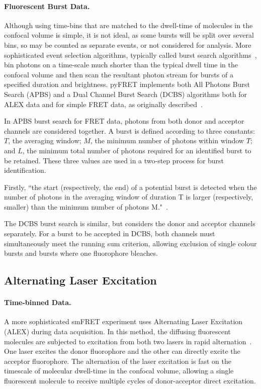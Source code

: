 \paragraph{Fluorescent Burst Data.}
Although using time-bins that are matched to the dwell-time of molecules in the confocal volume is simple, it is not ideal, as some bursts will be split over several bins, so may be counted as separate events, or not considered for analysis. More sophisticated event selection algorithms, typically called burst search algorithms~\cite{nir06}, bin photons on a time-scale much shorter than the typical dwell time in the confocal volume and then scan the resultant photon stream for bursts of a specified duration and brightness. pyFRET implements both All Photons Burst Search (APBS) and a Dual Channel Burst Search (DCBS) algorithms both for ALEX data and for simple FRET data, as originally described~\cite{nir06}.

In APBS burst search for FRET data, photons from both donor and acceptor channels are considered together. A burst is defined according to three constants: $T$, the averaging window; $M$, the minimum number of photons within window $T$; and $L$, the minimum total number of photons required for an identified burst to be retained. These three values are used in a two-step process for burst identification.

Firstly, ``the start (respectively, the end) of a potential burst is detected when the number of photons in the averaging window of duration T is larger (respectively, smaller) than the minimum number of photons M."~\cite{nir06}.

The DCBS burst search is similar, but considers the donor and acceptor channels separately. For a burst to be accepted in DCBS, both channels must simultaneously meet the running sum criterion, allowing exclusion of single colour bursts and bursts where one fluorophore bleaches.

\subsection{Alternating Laser Excitation}
\paragraph{Time-binned Data.}
A more sophisticated smFRET experiment uses Alternating Laser Excitation (ALEX) during data acquisition. In this method, the diffusing fluorescent molecules are subjected to excitation from both two lasers in rapid alternation~\cite{kapanidis05}. One laser excites the donor fluorophore and the other can directly excite the acceptor fluorophore. The alternation of the laser excitation is fast on the timescale of molecular dwell-time in the confocal volume, allowing a single fluorescent molecule to receive multiple cycles of donor-acceptor direct excitation.

